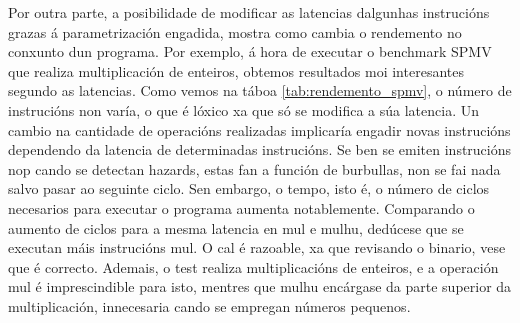 Por outra parte, a posibilidade de modificar as latencias dalgunhas instrucións grazas á parametrización engadida, mostra como cambia o rendemento no conxunto dun programa. Por exemplo, á hora de executar o benchmark SPMV que realiza multiplicación de enteiros, obtemos resultados moi interesantes segundo as latencias. Como vemos na táboa \ref{tab:rendemento_spmv}, o número de instrucións non varía, o que é lóxico xa que só se modifica a súa latencia. Un cambio na cantidade de operacións realizadas implicaría engadir novas instrucións dependendo da latencia de determinadas instrucións. Se ben se emiten instrucións \acrshort{nop} cando se detectan hazards, estas fan a función de burbullas, non se fai nada salvo pasar ao seguinte ciclo. Sen embargo, o tempo, isto é, o número de ciclos necesarios para executar o programa aumenta notablemente. Comparando o aumento de ciclos para a mesma latencia en mul e mulhu, dedúcese que se executan máis instrucións mul. O cal é razoable, xa que revisando o binario, vese que é correcto. Ademais, o test realiza multiplicacións de enteiros, e a operación mul é imprescindible para isto, mentres que mulhu encárgase da parte superior da multiplicación, innecesaria cando se empregan números pequenos.

